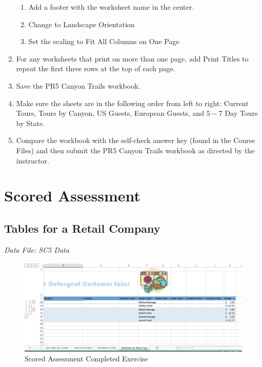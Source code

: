 \begin{enumerate}
	\begin{enumerate}
		\item Add a footer with the worksheet name in the center.
		\item Change to Landscape Orientation
		\item Set the scaling to Fit All Columns on One Page
	\end{enumerate}

	\item For any worksheets that print on more than one page, add Print Titles to repeat the first three rows at the top of each page.
	\item Save the PR5 Canyon Trails workbook.
	\item Make sure the sheets are in the following order from left to right: Current Tours, Tours by Canyon, US Guests, European Guests, and $ 5-7 $ Day Tours by State.
	\item Compare the workbook with the self-check answer key (found in the Course Files) and then submit the PR5 Canyon Trails workbook as directed by the instructor.

\end{enumerate}

\section{Scored Assessment}

\subsection{Tables for a Retail Company}

\textit{Data File: SC5 Data}

\begin{figure}[H]
	\centering
	\includegraphics[width=\maxwidth{.95\linewidth}]{gfx/ch05_fig31}
	\caption{Scored Assessment Completed Exercise}
	\label{05:fig31}
\end{figure}

